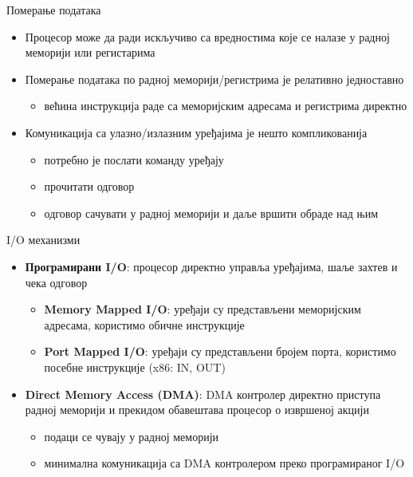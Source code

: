 \documentclass[xcolor=table]{beamer}
\begin{document}
    \begin{frame}[allowframebreaks]{Померање података}
        \begin{itemize}
            \item Процесор може да ради искључиво са вредностима које се налазе у радној меморији или регистарима
            \item Померање података по радној меморији/регистрима је релативно једноставно
            \begin{itemize}
                \item већина инструкција раде са меморијским адресама и регистрима директно
            \end{itemize}
            \item Комуникација са улазно/излазним уређајима је нешто компликованија
            \begin{itemize}
                \item потребно је послати команду уређају
                \item прочитати одговор
                \item одговор сачувати у радној меморији и даље вршити обраде над њим
            \end{itemize}
        \end{itemize}
    \end{frame}
    
    \begin{frame}{I/O механизми}
        \begin{itemize}
            \item \textbf{Програмирани I/O}: процесор директно управља уређајима, шаље захтев и чека одговор
            \begin{itemize}
                \item \textbf{Memory Mapped I/O}: уређаји су представљени меморијским адресама, користимо обичне инструкције
                \item \textbf{Port Mapped I/O}: уређаји су представљени бројем порта, користимо посебне инструкције (x86: IN, OUT)
            \end{itemize}
            \item \textbf{Direct Memory Access (DMA)}: DMA контролер директно приступа радној меморији и прекидом обавештава процесор о извршеној акцији
            \begin{itemize}
                \item подаци се чувају у радној меморији
                \item минимална комуникација са DMA контролером преко програмираног I/O
            \end{itemize}
        \end{itemize}
    \end{frame}
    
\end{document}
